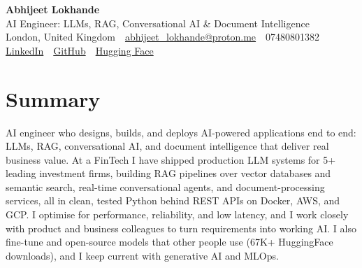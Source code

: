 \documentclass[10pt,a4paper]{article}
\newcommand{\sep}{\,\textcolor{accent!60}{\textbar}\,}
\begin{document}
\begin{center}
  {\fontsize{24}{26}\selectfont\bfseries Abhijeet Lokhande}\\[3pt]
  {\color{accent}\large AI Engineer: LLMs, RAG, Conversational AI \& Document Intelligence}\\[5pt]
  {\small
    London, United Kingdom \sep
    \href{mailto:abhijeet_lokhande@proton.me}{abhijeet\_lokhande@proton.me} \sep
    07480801382 \\[2pt]
    \href{https://www.linkedin.com/in/ablds/}{LinkedIn} \sep
    \href{https://github.com/abhijeetscode}{GitHub} \sep
    \href{https://huggingface.co/ab-ai}{Hugging Face}
  }
\end{center}
\vspace{2pt}

\section{Summary}
AI engineer who designs, builds, and deploys AI-powered applications end to end: LLMs, RAG, conversational AI, and document intelligence that deliver real business value. At a FinTech I have shipped production LLM systems for 5+ leading investment firms, building RAG pipelines over vector databases and semantic search, real-time conversational agents, and document-processing services, all in clean, tested Python behind REST APIs on Docker, AWS, and GCP. I optimise for performance, reliability, and low latency, and I work closely with product and business colleagues to turn requirements into working AI. I also fine-tune and open-source models that other people use (67K+ HuggingFace downloads), and I keep current with generative AI and MLOps.

\end{document}
